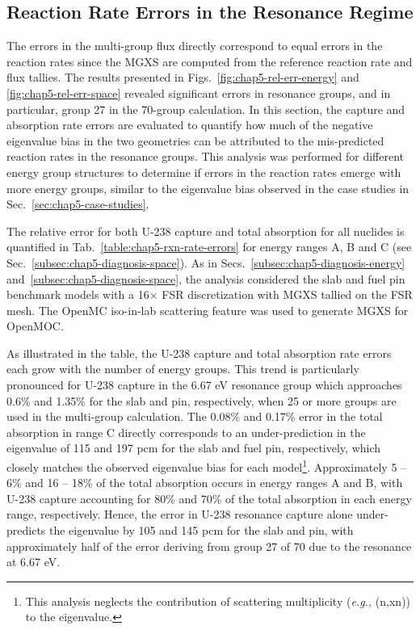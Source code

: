 
\subsection{Reaction Rate Errors in the Resonance Regime}
\label{subsec:chap5-diagnosis-rxn-rates}

The errors in the multi-group flux directly correspond to equal errors in the reaction rates since the \ac{MGXS} are computed from the reference reaction rate and flux tallies. The results presented in Figs.~\ref{fig:chap5-rel-err-energy} and \ref{fig:chap5-rel-err-space} revealed significant errors in resonance groups, and in particular, group 27 in the 70-group calculation. In this section, the capture and absorption rate errors are evaluated to quantify how much of the negative eigenvalue bias in the two geometries can be attributed to the mis-predicted reaction rates in the resonance groups. This analysis was performed for different energy group structures to determine if errors in the reaction rates emerge with more energy groups, similar to the eigenvalue bias observed in the case studies in Sec.~\ref{sec:chap5-case-studies}.

The relative error for both U-238 capture and total absorption for all nuclides is quantified in Tab.~\ref{table:chap5-rxn-rate-errors} for energy ranges A, B and C (see Sec.~\ref{subsec:chap5-diagnosis-space}). As in Secs.~\ref{subsec:chap5-diagnosis-energy} and~\ref{subsec:chap5-diagnosis-space}, the analysis considered the slab and fuel pin benchmark models with a 16$\times$ \ac{FSR} discretization with \ac{MGXS} tallied on the \ac{FSR} mesh. The OpenMC iso-in-lab scattering feature was used to generate \ac{MGXS} for OpenMOC.

As illustrated in the table, the U-238 capture and total absorption rate errors each grow with the number of energy groups. This trend is particularly pronounced for U-238 capture in the 6.67 eV resonance group which approaches 0.6\% and 1.35\% for the slab and pin, respectively, when 25 or more groups are used in the multi-group calculation. The 0.08\% and 0.17\% error in the total absorption in range C directly corresponds to an under-prediction in the eigenvalue of 115 and 197 \ac{pcm} for the slab and fuel pin, respectively, which closely matches the observed eigenvalue bias for each model\footnote{This analysis neglects the contribution of scattering multiplicity (\textit{e.g.,} (n,xn)) to the eigenvalue.}. Approximately 5 -- 6\% and 16 -- 18\% of the total absorption occurs in energy ranges A and B, with U-238 capture accounting for 80\% and 70\% of the total absorption in each energy range, respectively. Hence, the error in U-238 resonance capture alone under-predicts the eigenvalue by 105 and 145 \ac{pcm} for the slab and pin, with approximately half of the error deriving from group 27 of 70 due to the resonance at 6.67 eV. 

